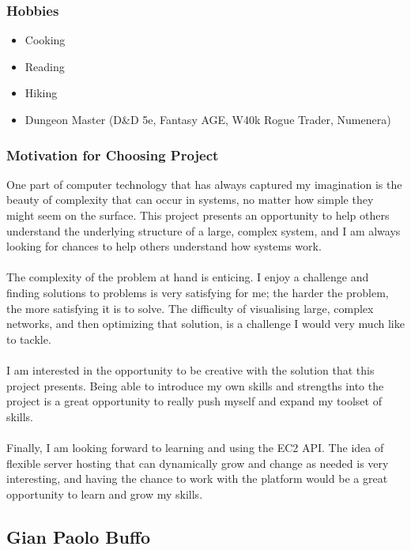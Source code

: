 \documentclass{article}
\begin{document}
		\subsubsection{Hobbies}
			\begin{itemize}
				\item Cooking
				\item Reading
				\item Hiking
				\item Dungeon Master (D\&D 5e, Fantasy AGE, W40k Rogue Trader, Numenera)
			\end{itemize}
		\subsubsection{Motivation for Choosing Project}
			One part of computer technology that has always captured my imagination is the beauty of complexity that can occur in systems, no matter how simple they might seem on the surface. This project presents an opportunity to help others understand the underlying structure of a large, complex system, and I am always looking for chances to help others understand how systems work.
\\\\		
			The complexity of the problem at hand is enticing. I enjoy a challenge and finding solutions to problems is very satisfying for me; the harder the problem, the more satisfying it is to solve. The difficulty of visualising large, complex networks, and then optimizing that solution, is a challenge I would very much like to tackle.
\\\\			
			I am interested in the opportunity to be creative with the solution that this project presents. Being able to introduce my own skills and strengths into the project is a great opportunity to really push myself and expand my toolset of skills.
\\\\			
			Finally, I am looking forward to learning and using the EC2 API. The idea of flexible server hosting that can dynamically grow and change as needed is very interesting, and having the chance to work with the platform would be a great opportunity to learn and grow my skills.
		
	\cleardoublepage	
	
	\subsection{Gian Paolo Buffo}
	
\end{document}
